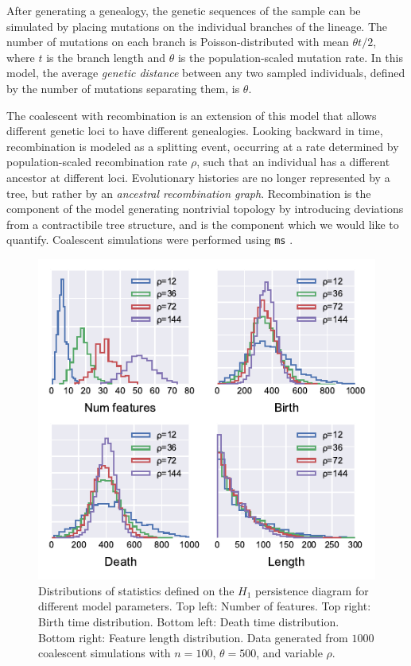 After generating a genealogy, the genetic sequences of the sample can be simulated by placing mutations on the individual branches of the lineage.
The number of mutations on each branch is Poisson-distributed with mean $\theta t / 2$, where $t$ is the branch length and $\theta$ is the population-scaled mutation rate.
In this model, the average \emph{genetic distance} between any two sampled individuals, defined by the number of mutations separating them, is $\theta$.

The coalescent with recombination is an extension of this model that allows different genetic loci to have different genealogies.
Looking backward in time, recombination is modeled as a splitting event, occurring at a rate determined by population-scaled recombination rate $\rho$, such that an individual has a different ancestor at different loci.
Evolutionary histories are no longer represented by a tree, but rather by an \emph{ancestral recombination graph}.
Recombination is the component of the model generating nontrivial topology by introducing deviations from a contractibile tree structure, and is the component which we would like to quantify.
Coalescent simulations were performed using \texttt{ms} \cite{Hudson:2002}.

\begin{figure}
\begin{center}
\centerline{\includegraphics[width=\columnwidth]{./fig/coalescent_sims.pdf}}
\caption[Distributions of statistics defined on the $H_1$ persistence diagram for different model parameters]{Distributions of statistics defined on the $H_1$ persistence diagram for different model parameters. Top left: Number of features. Top right: Birth time distribution. Bottom left: Death time distribution. Bottom right: Feature length distribution. Data generated from $1000$ coalescent simulations with $n=100$, $\theta=500$, and variable $\rho$.}
\label{fig:coalescent_sims}
\end{center}
\end{figure}

